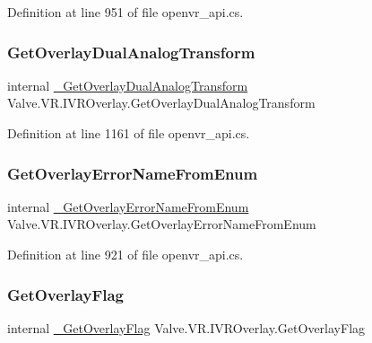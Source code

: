 Definition at line 951 of file openvr\+\_\+api.\+cs.

\mbox{\label{struct_valve_1_1_v_r_1_1_i_v_r_overlay_a4a41c3a02838c8d2bbc9307c7458bf71}} 
\subsubsection{\texorpdfstring{GetOverlayDualAnalogTransform}{GetOverlayDualAnalogTransform}}
{\footnotesize\ttfamily internal \mbox{\hyperlink{struct_valve_1_1_v_r_1_1_i_v_r_overlay_a9c8eb4e102476da54755cc70340f4c48}{\+\_\+\+Get\+Overlay\+Dual\+Analog\+Transform}} Valve.\+V\+R.\+I\+V\+R\+Overlay.\+Get\+Overlay\+Dual\+Analog\+Transform}



Definition at line 1161 of file openvr\+\_\+api.\+cs.

\mbox{\label{struct_valve_1_1_v_r_1_1_i_v_r_overlay_a5e0488d484a36ac72d2c82138db9c89f}} 
\subsubsection{\texorpdfstring{GetOverlayErrorNameFromEnum}{GetOverlayErrorNameFromEnum}}
{\footnotesize\ttfamily internal \mbox{\hyperlink{struct_valve_1_1_v_r_1_1_i_v_r_overlay_a55f8c3483bb8a333ac58781e174bde62}{\+\_\+\+Get\+Overlay\+Error\+Name\+From\+Enum}} Valve.\+V\+R.\+I\+V\+R\+Overlay.\+Get\+Overlay\+Error\+Name\+From\+Enum}



Definition at line 921 of file openvr\+\_\+api.\+cs.

\mbox{\label{struct_valve_1_1_v_r_1_1_i_v_r_overlay_a47b9e31a190c45785a89354955fb2ebe}} 
\subsubsection{\texorpdfstring{GetOverlayFlag}{GetOverlayFlag}}
{\footnotesize\ttfamily internal \mbox{\hyperlink{struct_valve_1_1_v_r_1_1_i_v_r_overlay_ae8d49da4f9a47a988edc9492f9e92831}{\+\_\+\+Get\+Overlay\+Flag}} Valve.\+V\+R.\+I\+V\+R\+Overlay.\+Get\+Overlay\+Flag}



